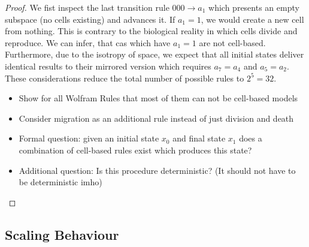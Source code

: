 \documentclass{article}
\begin{document}
\begin{proof}
    We fist inspect the last transition rule $000\rightarrow a_1$ which presents an empty subspace
    (no cells existing) and advances it.
    If $a_1=1$, we would create a new cell from nothing.
    This is contrary to the biological reality in which cells divide and reproduce.
    We can infer, that \acp{ca} which have $a_1=1$ are not cell-based.
    Furthermore, due to the isotropy of space, we expect that all initial states deliver identical
    results to their mirrored version which requires $a_7=a_4$ and $a_5=a_2$.
    These considerations reduce the total number of possible rules to $2^5=32$.

    \begin{itemize}
        \item Show for all Wolfram Rules that most of them can not be cell-based models
        \item Consider migration as an additional rule instead of just division and death
        \item Formal question: given an initial state $x_0$ and final state $x_1$ does a combination
            of cell-based rules exist which produces this state?
        \item Additional question: Is this procedure deterministic? (It should not have to be
            deterministic imho)
    \end{itemize}
\end{proof}

\subsection{Scaling Behaviour}
\end{document}
